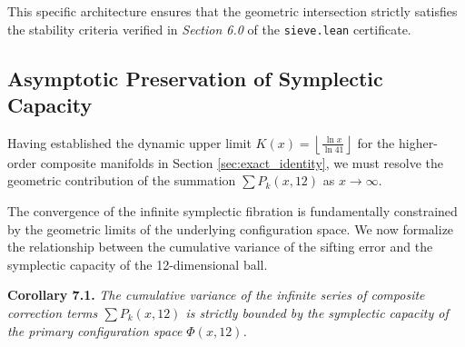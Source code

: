 \documentclass[sn-mathphys-num, pdflatex]{sn-jnl}
\begin{document}
This specific architecture ensures that the geometric intersection strictly satisfies the stability criteria verified in \textit{Section 6.0} of the \texttt{sieve.lean} certificate.

\subsection{Asymptotic Preservation of Symplectic Capacity}

Having established the dynamic upper limit $K(x) = \left\lfloor \frac{\ln x}{\ln 41} \right\rfloor$ for the higher-order composite manifolds in Section \ref{sec:exact_identity}, we must resolve the geometric contribution of the summation $\sum P_k(x,12)$ as $x \rightarrow \infty$.

The convergence of the infinite symplectic fibration is fundamentally constrained by the geometric limits of the underlying configuration space. We now formalize the relationship between the cumulative variance of the sifting error and the symplectic capacity of the 12-dimensional ball.

\textbf{Corollary 7.1.} \textit{The cumulative variance of the infinite series of composite correction terms $\sum P_k(x,12)$ is strictly bounded by the symplectic capacity of the primary configuration space $\Phi(x,12)$.}
\end{document}
